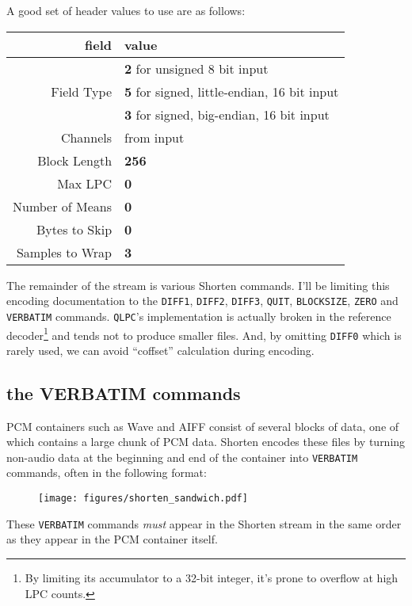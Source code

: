 A good set of header values to use are as follows:
\begin{table}[h]
\begin{tabular}{|r|l|}
\hline
field & value \\
\hline
& \textbf{2} for unsigned 8 bit input \\
Field Type & \textbf{5} for signed, little-endian, 16 bit input \\
& \textbf{3} for signed, big-endian, 16 bit input \\
Channels & from input \\
Block Length & \textbf{256} \\
Max LPC & \textbf{0} \\
Number of Means & \textbf{0} \\
Bytes to Skip & \textbf{0} \\
Samples to Wrap & \textbf{3} \\
\hline
\end{tabular}
\end{table}
\par
\noindent
The remainder of the stream is various Shorten commands.
I'll be limiting this encoding documentation to the \texttt{DIFF1},
\texttt{DIFF2}, \texttt{DIFF3}, \texttt{QUIT}, \texttt{BLOCKSIZE},
\texttt{ZERO} and \texttt{VERBATIM} commands.
\texttt{QLPC}'s implementation is actually broken in the reference
decoder\footnote{By limiting its accumulator to a 32-bit integer,
it's prone to overflow at high LPC counts.} and tends not to
produce smaller files.
And, by omitting \texttt{DIFF0} which is rarely used,
we can avoid ``coffset'' calculation during encoding.

\pagebreak

\subsection{the VERBATIM commands}

PCM containers such as Wave and AIFF consist of
several blocks of data, one of which contains a large chunk of
PCM data.
Shorten encodes these files by turning non-audio data at
the beginning and end of the container into \texttt{VERBATIM} commands,
often in the following format:
\begin{figure}[h]
\texttt{[image: figures/shorten\_sandwich.pdf]}
\end{figure}
\par
\noindent
These \texttt{VERBATIM} commands \textit{must} appear in
the Shorten stream in the same order as they appear in the
PCM container itself.

